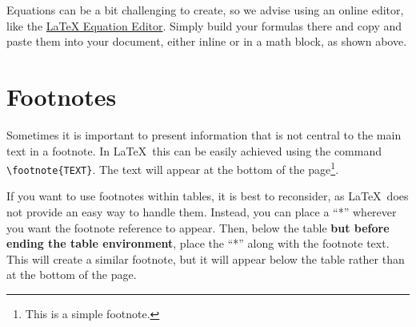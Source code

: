 {Equations can be a bit challenging to create, so we advise using an online editor, like the \href{https://latexeditor.lagrida.com/}{LaTeX Equation Editor}. Simply build your formulas there and copy and paste them into your document, either inline or in a math block, as shown above.

\section{Footnotes}
Sometimes it is important to present information that is not central to the main text in a footnote. In \LaTeX\, this can be easily achieved using the command \verb|\footnote{TEXT}|. The text will appear at the bottom of the page\footnote{This is a simple footnote.}.

If you want to use footnotes within tables, it is best to reconsider, as \LaTeX\ does not provide an easy way to handle them. Instead, you can place a ``*'' wherever you want the footnote reference to appear. Then, below the table \textbf{but before ending the table environment}, place the ``*'' along with the footnote text. This will create a similar footnote, but it will appear below the table rather than at the bottom of the page.
}
